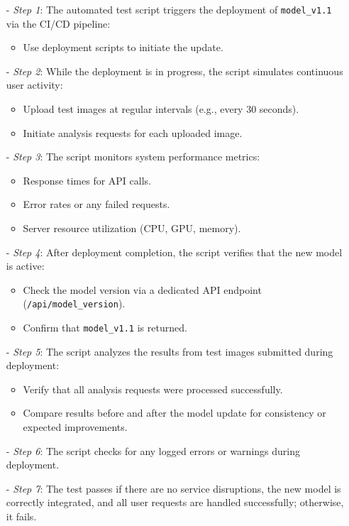 \documentclass[12pt, titlepage]{article}
\begin{document}
\begin{enumerate}
\begin{itemize}
  \item[-] \textit{Step 1}: The automated test script triggers the deployment of \texttt{model\_v1.1} via the CI/CD pipeline:
    \begin{itemize}
      \item Use deployment scripts to initiate the update.
    \end{itemize}
  \item[-] \textit{Step 2}: While the deployment is in progress, the script simulates continuous user activity:
    \begin{itemize}
      \item Upload test images at regular intervals (e.g., every 30 seconds).
      \item Initiate analysis requests for each uploaded image.
    \end{itemize}
  \item[-] \textit{Step 3}: The script monitors system performance metrics:
    \begin{itemize}
      \item Response times for API calls.
      \item Error rates or any failed requests.
      \item Server resource utilization (CPU, GPU, memory).
    \end{itemize}
  \item[-] \textit{Step 4}: After deployment completion, the script verifies that the new model is active:
    \begin{itemize}
      \item Check the model version via a dedicated API endpoint (\texttt{/api/model\_version}).
      \item Confirm that \texttt{model\_v1.1} is returned.
    \end{itemize}
  \item[-] \textit{Step 5}: The script analyzes the results from test images submitted during deployment:
    \begin{itemize}
      \item Verify that all analysis requests were processed successfully.
      \item Compare results before and after the model update for consistency or expected improvements.
    \end{itemize}
  \item[-] \textit{Step 6}: The script checks for any logged errors or warnings during deployment.
  \item[-] \textit{Step 7}: The test passes if there are no service disruptions, the new model is correctly integrated, and all user requests are handled successfully; otherwise, it fails.
\end{itemize}

\end{enumerate}
\end{document}
